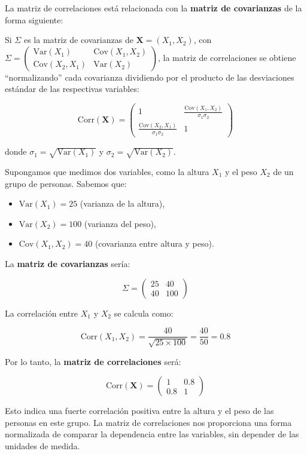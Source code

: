 \documentclass[
]{article}
\providecommand{\tightlist}{%
  \setlength{\itemsep}{0pt}\setlength{\parskip}{0pt}}
\begin{document}
La matriz de correlaciones está relacionada con la \textbf{matriz de covarianzas} de la forma siguiente:

Si \(\Sigma\) es la matriz de covarianzas de \(\mathbf{X}=(X_1,X_2)\), con \(\Sigma=\begin{pmatrix} \text{Var}(X_1) & \text{Cov}(X_1,X_2)\\ \text{Cov}(X_2,X_1) & \text{Var}(X_2) \end{pmatrix}\), la matriz de correlaciones se obtiene ``normalizando'' cada covarianza dividiendo por el producto de las desviaciones estándar de las respectivas variables:

\[
\text{Corr}(\mathbf{X})=
\begin{pmatrix}
1 & \frac{\text{Cov}(X_1,X_2)}{\sigma_1\sigma_2}\\
\frac{\text{Cov}(X_2,X_1)}{\sigma_1\sigma_2} & 1
\end{pmatrix}
\]

donde \(\sigma_1=\sqrt{\text{Var}(X_1)}\) y \(\sigma_2=\sqrt{\text{Var}(X_2)}\).

Supongamos que medimos dos variables, como la altura \(X_1\) y el peso \(X_2\) de un grupo de personas. Sabemos que:

\begin{itemize}
\tightlist
\item
  \(\text{Var}(X_1)=25\) (varianza de la altura),
\item
  \(\text{Var}(X_2)=100\) (varianza del peso),
\item
  \(\text{Cov}(X_1,X_2)=40\) (covarianza entre altura y peso).
\end{itemize}

La \textbf{matriz de covarianzas} sería:

\[
\Sigma=
\begin{pmatrix}
25 & 40\\
40 & 100
\end{pmatrix}
\]

La correlación entre \(X_1\) y \(X_2\) se calcula como:

\[
\text{Corr}(X_1,X_2)=\frac{40}{\sqrt{25 \times 100}}=\frac{40}{50}=0.8
\]

Por lo tanto, la \textbf{matriz de correlaciones} será:

\[
\text{Corr}(\mathbf{X})=
\begin{pmatrix}
1 & 0.8\\
0.8 & 1
\end{pmatrix}
\]

Esto indica una fuerte correlación positiva entre la altura y el peso de las personas en este grupo. La matriz de correlaciones nos proporciona una forma normalizada de comparar la dependencia entre las variables, sin depender de las unidades de medida.
\end{document}
